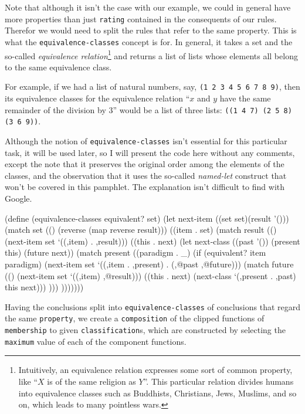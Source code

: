 Note that although it isn't the case with our example, we could in
general have more properties than just \texttt{rating} contained
in the consequents of our rules. Therefor we would need to split
the rules that refer to the same property. This is what the
\texttt{equivalence-classes} concept is for. In general, it takes
a set and the so-called \textit{equivalence relation}\footnote{
Intuitively, an equivalence relation expresses some sort of common
property, like ``$X$ is of the same religion as $Y$''. This
particular relation divides humans into equivalence classes such
as Buddhists, Christians, Jews, Muslims, and so on, which
leads to many pointless wars.} and returns a list of lists whose
elements all belong to the same equivalence class.

For example, if we had a list of natural numbers, say,
\texttt{(1 2 3 4 5 6 7 8 9)}, then its equivalence classes
for the equivalence relation ``$x$ and $y$ have the same
remainder of the division by $3$'' would be a list of three
lists: \texttt{((1 4 7) (2 5 8) (3 6 9))}.

Although the notion of \texttt{equivalence-classes} isn't essential
for this particular task, it will be used later, so I will present
the code here without any comments, except the note that it preserves
the original order among the elements of the classes, and the
observation that it uses the so-called \textit{named-let} construct
that won't be covered in this pamphlet. The explanation isn't
difficult to find with Google.

\begin{Snippet}
(define (equivalence-classes equivalent? set)
  (let next-item ((set set)(result '()))
    (match set
      (()
       (reverse (map reverse result)))
      ((item . set)
       (match result
	 (()
	  (next-item set `((,item) . ,result)))
	 ((this . next)
	  (let next-class ((past '()) (present this) (future next))
	    (match present
	      ((paradigm . _)
	       (if (equivalent? item paradigm)
		   (next-item set `((,item . ,present)
				    . (,@past ,@future)))
		   (match future
		     (()
		      (next-item set `((,item) ,@result)))
		     ((this . next)
		      (next-class `(,present . ,past) this next)))
                    )))
             )))))))
\end{Snippet}

Having the conclusions split into \texttt{equivalence-classes}
of conclusions that regard the same \texttt{property}, we create
a \texttt{composition} of the clipped functions of \texttt{membership}
to given \texttt{classification}s, which are constructed by
selecting the \texttt{maximum} value of each of the component
functions.

